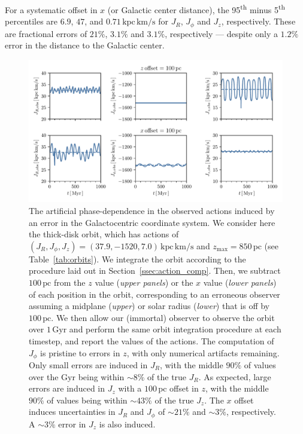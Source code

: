 \documentclass[twocolumn]{aastex62}
\newcommand{\pc}{\text{pc}}
\newcommand{\Gyr}{\text{Gyr}}
\newcommand{\kms}{\text{km}/\text{s}}
\newcommand{\actunit}{\text{kpc}\,\kms}
\begin{document}
For a systematic offset in $x$ (or Galactic center distance), the
95\textsuperscript{th} minus 5\textsuperscript{th} percentiles are $6.9$,
$47$, and $0.71\,\actunit$ for $J_R$, $J_{\phi}$ and $J_z$, respectively.
These are fractional errors of $21\%$, $3.1\%$ and $3.1\%$, respectively ---
despite only a $1.2\%$ error in the distance to the Galactic center.

\begin{figure}
\begin{center}
\includegraphics[width=\textwidth]{fig/schmactions_one_orbit.pdf}
\end{center}
\caption{The artificial phase-dependence in the observed actions induced by an
error in the Galactocentric coordinate system. We consider here the thick-disk
orbit, which has actions of $(J_R, J_{\phi}, J_z) = (37.9, -1520,
7.0)\,\actunit$ and $z_{\text{max}}=850\,\pc$ (see Table~\ref{tab:orbits}). We
integrate the orbit according to the procedure laid out in
Section~\ref{ssec:action_comp}. Then, we subtract $100\,\pc$ from the $z$
value ({\em upper panels}) or the $x$ value ({\em lower panels}) of each
position in the orbit, corresponding to an erroneous observer assuming a
midplane ({\em upper}) or solar radius ({\em lower}) that is off by
$100\,\pc$. We then allow our (immortal) observer to observe the orbit over
$1\,\Gyr$ and perform the same orbit integration procedure at each timestep,
and report the values of the actions. The computation of $J_{\phi}$ is
pristine to errors in $z$, with only numerical artifacts remaining. Only small
errors are induced in $J_R$, with the middle $90\%$ of values over the $\Gyr$
being within $\sim8\%$ of the true $J_R$. As expected, large errors are
induced in $J_z$ with a $100\,\pc$ offset in $z$, with the middle $90\%$ of
values being within $\sim43\%$ of the true $J_z$. The $x$ offset induces
uncertainties in $J_R$ and $J_{\phi}$ of $\sim21\%$ and $\sim3\%$,
respectively. A $\sim3\%$ error in $J_z$ is also induced.}
\label{fig:one_orbit_wrong_ref}
\end{figure}
\end{document}
